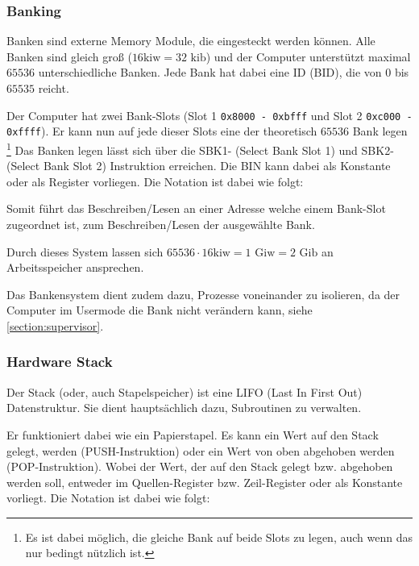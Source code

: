 \documentclass{scrartcl}
\begin{document}
\subsubsection{\label{section:banking}Banking}


Banken sind externe Memory Module, die eingesteckt werden können.
Alle Banken sind gleich groß ($16\text{kiw} = 32\text{ kib}$) und der Computer unterstützt maximal $65536$ unterschiedliche Banken.
Jede Bank hat dabei eine ID (BID), die von $0$ bis $65535$ reicht.

Der Computer hat zwei Bank-Slots (Slot 1 \texttt{0x8000 - 0xbfff} und Slot 2 \texttt{0xc000 - 0xffff}).
Er kann nun auf jede dieser Slots eine der theoretisch $65536$ Bank legen
\footnote{Es ist dabei möglich, die gleiche Bank auf beide Slots zu legen, auch wenn das nur bedingt nützlich ist.}
Das Banken legen lässt sich über die SBK1- (Select Bank Slot 1) und SBK2- (Select Bank Slot 2) Instruktion erreichen.
Die BIN kann dabei als Konstante oder als Register vorliegen. Die Notation ist dabei wie folgt:


Somit führt das Beschreiben/Lesen an einer Adresse welche einem Bank-Slot zugeordnet ist, zum Beschreiben/Lesen der ausgewählte Bank.

Durch dieses System lassen sich $65536 \cdot 16\text{kiw} = 1\text{ Giw} = 2\text{ Gib}$ an Arbeitsspeicher ansprechen.

Das Bankensystem dient zudem dazu, Prozesse voneinander zu isolieren, da der Computer im Usermode die Bank nicht verändern kann, siehe \autoref{section:supervisor}.

\subsubsection{\label{section:stack}Hardware Stack}

Der Stack (oder, auch Stapelspeicher) ist eine LIFO (Last In First Out) Datenstruktur.
Sie dient hauptsächlich dazu, Subroutinen zu verwalten.

Er funktioniert dabei wie ein Papierstapel.
Es kann ein Wert auf den Stack gelegt, werden (PUSH-Instruktion) oder ein Wert von oben abgehoben werden (POP-Instruktion).
Wobei der Wert, der auf den Stack gelegt bzw. abgehoben werden soll, entweder im Quellen-Register bzw. Zeil-Register oder als Konstante vorliegt.
Die Notation ist dabei wie folgt:

\end{document}
